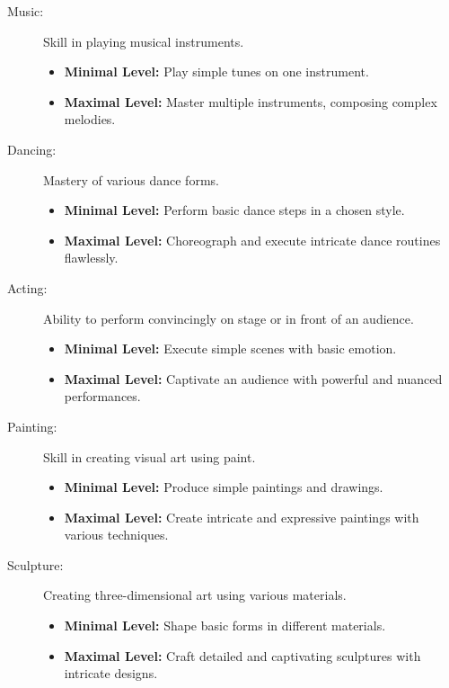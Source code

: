 \documentclass[12pt]{book}  %
\begin{document}
\begin{description}

    \item[Music:] Skill in playing musical instruments.
        \begin{itemize}
            \item \textbf{Minimal Level:} Play simple tunes on one instrument.
            \item \textbf{Maximal Level:} Master multiple instruments, composing complex melodies.
        \end{itemize}

    \item[Dancing:] Mastery of various dance forms.
        \begin{itemize}
            \item \textbf{Minimal Level:} Perform basic dance steps in a chosen style.
            \item \textbf{Maximal Level:} Choreograph and execute intricate dance routines flawlessly.
        \end{itemize}

    \item[Acting:] Ability to perform convincingly on stage or in front of an audience.
        \begin{itemize}
            \item \textbf{Minimal Level:} Execute simple scenes with basic emotion.
            \item \textbf{Maximal Level:} Captivate an audience with powerful and nuanced performances.
        \end{itemize}

    \item[Painting:] Skill in creating visual art using paint.
        \begin{itemize}
            \item \textbf{Minimal Level:} Produce simple paintings and drawings.
            \item \textbf{Maximal Level:} Create intricate and expressive paintings with various techniques.
        \end{itemize}

    \item[Sculpture:] Creating three-dimensional art using various materials.
        \begin{itemize}
            \item \textbf{Minimal Level:} Shape basic forms in different materials.
            \item \textbf{Maximal Level:} Craft detailed and captivating sculptures with intricate designs.
        \end{itemize}


\end{description}
\end{document}
